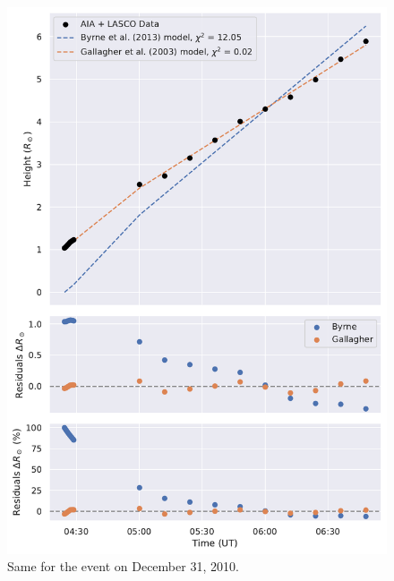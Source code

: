 \begin{figure}[!htp]
	\centering
	\includegraphics[width=0.8\hsize]{chapter2/figs/appendix/height_profile_residuals_aia_lasco_101231_01.pdf}
	\caption{Same for the event on December 31, 2010.}
\end{figure}

